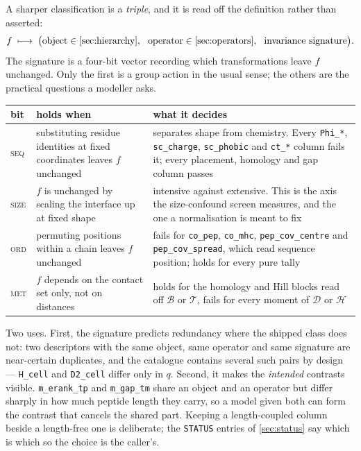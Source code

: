 \documentclass[11pt,a4paper]{article}
\newcommand{\dsc}[1]{\texttt{#1}}
\newcommand{\obj}[1]{\ensuremath{\mathcal{#1}}}
\begin{document}
A sharper classification is a \emph{triple}, and it is read off the definition rather than asserted:
%
\begin{equation}
f \;\longmapsto\; \big(\text{object} \in \cref{sec:hierarchy},\ \
                       \text{operator} \in \cref{sec:operators},\ \
                       \text{invariance signature}\big).
\end{equation}
%
The signature is a four-bit vector recording which transformations leave $f$ unchanged. Only the
first is a group action in the usual sense; the others are the practical questions a modeller asks.

\begin{center}\small
\begin{tabular}{@{}lp{}p{}@{}}
\toprule
bit & holds when & what it decides \\
\midrule
\textsc{seq} & substituting residue identities at fixed coordinates leaves $f$ unchanged &
  separates shape from chemistry. Every \dsc{Phi\_*}, \dsc{sc\_charge}, \dsc{sc\_phobic} and
  \dsc{ct\_*} column fails it; every placement, homology and gap column passes \\
\textsc{size} & $f$ is unchanged by scaling the interface up at fixed shape &
  intensive against extensive. This is the axis the size-confound screen measures, and the one a
  normalisation is meant to fix \\
\textsc{ord} & permuting positions within a chain leaves $f$ unchanged &
  fails for \dsc{co\_pep}, \dsc{co\_mhc}, \dsc{pep\_cov\_centre} and \dsc{pep\_cov\_spread}, which
  read sequence position; holds for every pure tally \\
\textsc{met} & $f$ depends on the contact set only, not on distances &
  holds for the homology and Hill blocks read off \obj{B} or \obj{T}, fails for every moment of
  \obj{D} or \obj{H} \\
\bottomrule
\end{tabular}
\end{center}

Two uses. First, the signature predicts redundancy where the shipped class does not: two descriptors
with the same object, same operator and same signature are near-certain duplicates, and the
catalogue contains several such pairs by design --- \dsc{H\_cell} and \dsc{D2\_cell} differ only in
$q$. Second, it makes the \emph{intended} contrasts visible. \dsc{m\_erank\_tp} and
\dsc{m\_gap\_tm} share an object and an operator but differ sharply in how much peptide length they
carry, so a model given both can form the contrast that cancels the shared part. Keeping a
length-coupled column beside a length-free one is deliberate; the \texttt{STATUS} entries of
\cref{sec:status} say which is which so the choice is the caller's.
\end{document}
